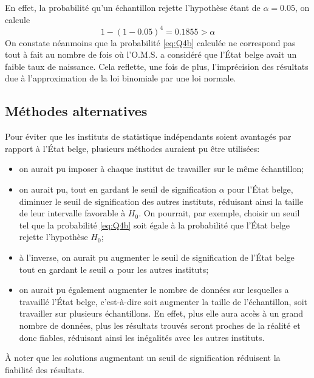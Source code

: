 \documentclass[a4paper, 12pt]{article}
\begin{document}
	En effet, la probabilité qu'un échantillon rejette l'hypothèse étant de \(\alpha = \num{0.05}\), on calcule
	\begin{equation}
	    \label{eq:Q4b}
	    1 - \left (1-0.05\right )^4 = \num{0.1855} > \alpha
	\end{equation}
	On constate néanmoins que la probabilité \eqref{eq:Q4b} calculée ne correspond pas tout à fait au nombre de fois où l'O.M.S. a considéré que l'État belge avait un faible taux de naissance. Cela reflette, une fois de plus, l'imprécision des résultats due à l'approximation de la loi binomiale par une loi normale.
	
	\subsection{Méthodes alternatives}
	Pour éviter que les instituts de statistique indépendants soient avantagés par rapport à l'État belge, plusieurs méthodes auraient pu être utilisées:
	
	\begin{itemize}
	    \item on aurait pu imposer à chaque institut de travailler sur le même échantillon;
	    \item on aurait pu, tout en gardant le seuil de signification \(\alpha\) pour l'État belge, diminuer le seuil de signification des autres instituts, réduisant ainsi la taille de leur intervalle favorable à \(H_0\). On pourrait, par exemple, choisir un seuil tel que la probabilité \eqref{eq:Q4b} soit égale à la probabilité que l'État belge rejette l'hypothèse \(H_0\);
	    \item à l'inverse, on aurait pu augmenter le seuil de signification de l'État belge tout en gardant le seuil \(\alpha\) pour les autres instituts;
	    \item on aurait pu également augmenter le nombre de données sur lesquelles a travaillé l'État belge, c'est-à-dire soit augmenter la taille de l'échantillon, soit travailler sur plusieurs échantillons. En effet, plus elle aura accès à un grand nombre de données, plus les résultats trouvés seront proches de la réalité et donc fiables, réduisant ainsi les inégalités avec les autres instituts.
	\end{itemize}
	
	À noter que les solutions augmentant un seuil de signification réduisent la fiabilité des résultats.
	
	
	\appendix
	\restoregeometry
	
\end{document}
